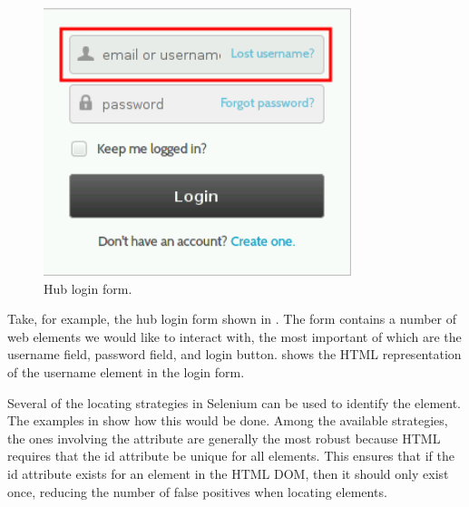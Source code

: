 \begin{figure}[H]
  \begin{minipage}[c]{0.48\linewidth}
  \end{minipage}
  \hfill
  \begin{minipage}[c]{0.48\linewidth}
    \centering
    \includegraphics[width=0.8\textwidth]
      {../../images/eps/hubzero_login_page_username_field.png}
    \caption{Hub login form.}
    \label{fig:hubzero_login_page_username_html_2}
  \end{minipage}
\end{figure}

Take, for example, the hub login form shown in
. The form contains a number of web
elements we would like to interact with, the most important of which are the
username field, password field, and login button.
 shows the HTML representation of the
username element in the login form.

Several of the locating strategies in Selenium can be used to identify the
element.  The examples in  show how this would be
done.  Among the available strategies, the ones involving the 
attribute are generally the most robust because HTML requires that the
id attribute be unique for all elements. This ensures that if the id attribute
exists for an element in the HTML DOM, then it should only exist once, reducing
the number of false positives when locating elements.


